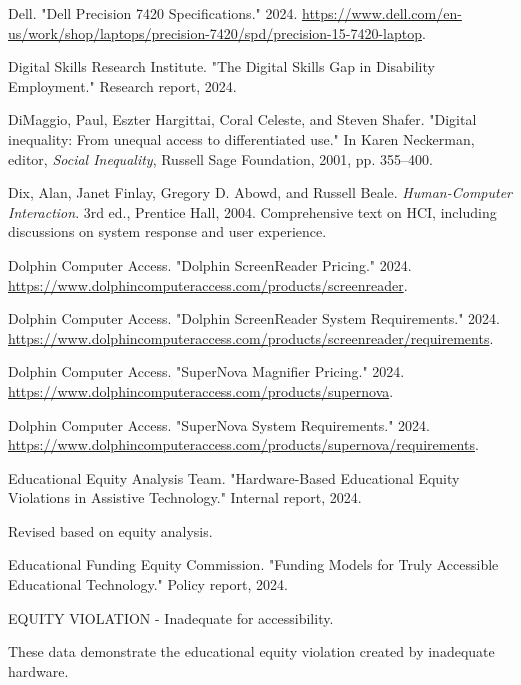 \begin{thebibliography}{99}
Dell. "Dell Precision 7420 Specifications." 2024. \url{https://www.dell.com/en-us/work/shop/laptops/precision-7420/spd/precision-15-7420-laptop}.

Digital Skills Research Institute. "The Digital Skills Gap in Disability Employment." Research report, 2024.

DiMaggio, Paul, Eszter Hargittai, Coral Celeste, and Steven Shafer. "Digital inequality: From unequal access to differentiated use." In Karen Neckerman, editor, \emph{Social Inequality}, Russell Sage Foundation, 2001, pp. 355--400.

Dix, Alan, Janet Finlay, Gregory D. Abowd, and Russell Beale. \emph{Human-Computer Interaction}. 3rd ed., Prentice Hall, 2004. Comprehensive text on HCI, including discussions on system response and user experience.

Dolphin Computer Access. "Dolphin ScreenReader Pricing." 2024. \url{https://www.dolphincomputeraccess.com/products/screenreader}.

Dolphin Computer Access. "Dolphin ScreenReader System Requirements." 2024. \url{https://www.dolphincomputeraccess.com/products/screenreader/requirements}.

Dolphin Computer Access. "SuperNova Magnifier Pricing." 2024. \url{https://www.dolphincomputeraccess.com/products/supernova}.

Dolphin Computer Access. "SuperNova System Requirements." 2024. \url{https://www.dolphincomputeraccess.com/products/supernova/requirements}.

Educational Equity Analysis Team. "Hardware-Based Educational Equity Violations in Assistive Technology." Internal report, 2024.

Revised based on equity analysis.

Educational Funding Equity Commission. "Funding Models for Truly Accessible Educational Technology." Policy report, 2024.

EQUITY VIOLATION - Inadequate for accessibility.

These data demonstrate the educational equity violation created by inadequate hardware.


\end{thebibliography}
